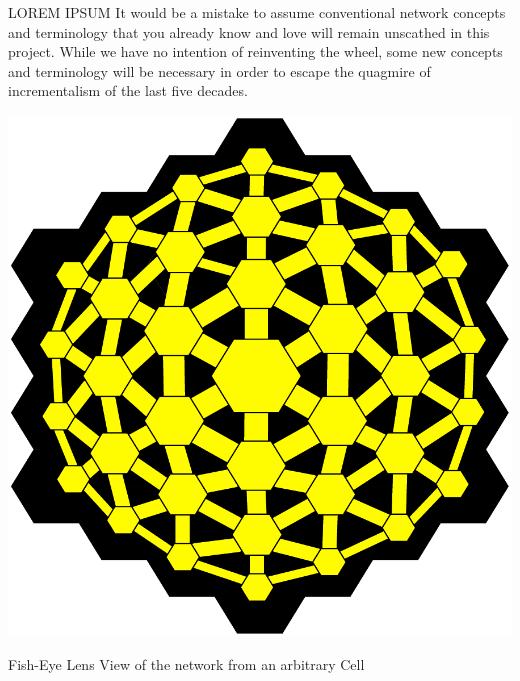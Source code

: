 LOREM IPSUM It would be a mistake to assume conventional network concepts and terminology that you already know and love will remain unscathed in this project. While we have no intention of reinventing the wheel,  some new concepts and terminology will be necessary in order to escape the quagmire of incrementalism of the last five decades.  

 \begin{marginfigure}
  \includegraphics[width=1.2\linewidth]{../../FIGURES/HexTensor.pdf}
   \caption{Fish-Eye Lens View of the network from an arbitrary Cell}
      \vspace{2em}
\end{marginfigure}
